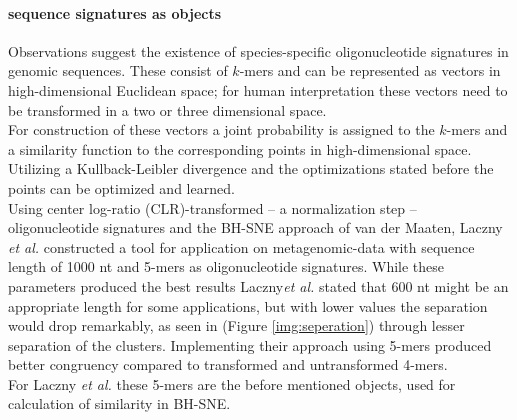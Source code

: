 \documentclass[twocolumn]{bmcart}%
\begin{document}
\paragraph*{sequence signatures as objects}
Observations suggest the existence of species-specific oligonucleotide signatures in genomic sequences\cite{Laczny2014}\cite{Cheng1194}. These consist of $k$-mers and can be represented as vectors in high-dimensional Euclidean space; for human interpretation these vectors need to be transformed in a two or three dimensional space\cite{Laczny2014}.\\
For construction of these vectors a joint probability is assigned to the $k$-mers and a similarity function to the corresponding points in high-dimensional space. Utilizing a Kullback-Leibler divergence and the optimizations stated before the points can be optimized and learned.\\
Using center log-ratio (CLR)-transformed -- a normalization step -- oligonucleotide signatures and the BH-SNE approach of van der Maaten, Laczny \textit{et al.} constructed a tool for application on metagenomic-data with sequence length of 1000 nt and 5-mers as oligonucleotide signatures. While these parameters produced the best results Laczny\textit{et al.} stated that 600 nt might be an appropriate length for some applications, but with lower values the separation would drop remarkably, as seen in (Figure  \ref{img:seperation}) through lesser separation of the clusters. Implementing their approach using 5-mers produced better congruency compared to transformed and untransformed 4-mers.\\
For Laczny \textit{et al.} these 5-mers are the before mentioned objects, used for calculation of similarity in BH-SNE.
\end{document}

